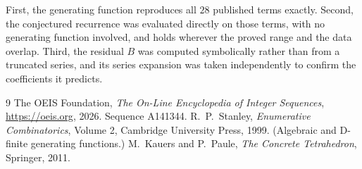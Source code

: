\documentclass[11pt,a4paper]{article}
\theoremstyle{plain}
\theoremstyle{definition}
\begin{document}
First, the generating function reproduces all $28$ published terms exactly. Second,
the conjectured recurrence was evaluated directly on those terms, with no generating function
involved, and holds wherever the proved range and the data overlap. Third, the residual $B$ was
computed symbolically rather than from a truncated series, and its series expansion was taken
independently to confirm the coefficients it predicts.

\begin{thebibliography}{9}
 The OEIS Foundation, \emph{The On-Line Encyclopedia of Integer Sequences},
\url{https://oeis.org}, 2026. Sequence A141344.
 R.~P.~Stanley, \emph{Enumerative Combinatorics}, Volume 2, Cambridge
University Press, 1999. (Algebraic and D-finite generating functions.)
 M.~Kauers and P.~Paule, \emph{The Concrete Tetrahedron}, Springer, 2011.
\end{thebibliography}
\end{document}
